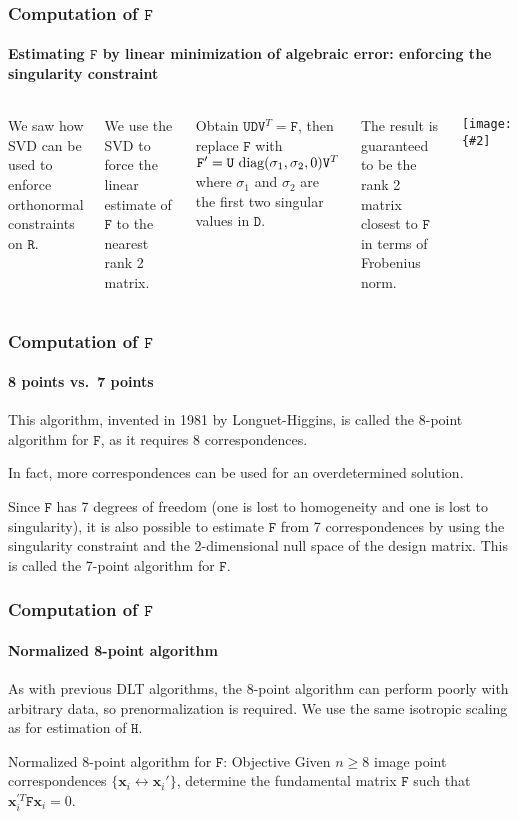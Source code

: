 \documentclass[aspectratio=169]{beamer}
\renewcommand{\vec}[1]{\boldsymbol{#1}}
\newcommand{\mat}[1]{\mathtt{#1}}
\newcommand{\myfig}[3]{\centerline{\texttt{[image: \{\#2]}}}
    \centerline{\scriptsize #3}}
\begin{document}
\begin{frame}
\frametitle{Computation of $\mat{F}$}
\framesubtitle{Estimating $\mat{F}$ by linear minimization of
  algebraic error: enforcing the singularity constraint}

\begin{columns}
\column{2.5in} We saw how SVD can be used to enforce orthonormal
constraints on $\mat{R}$.

\medskip

We use the SVD to force the linear estimate of $\mat{F}$ to the
\alert{nearest rank 2 matrix}.

\medskip

Obtain $\mat{U}\mat{D}\mat{V}^T=\mat{F}$, then
replace $\mat{F}$ with $\mat{F}'=\mat{U}\text{\
diag}(\sigma_1,\sigma_2,0)\mat{V}^T$ where $\sigma_1$ and $\sigma_2$
are the first two singular values in $\mat{D}$.

\medskip

The result is guaranteed to be the rank 2 matrix
closest to $\mat{F}$ in terms of Frobenius norm.

\column{2in}
\myfig{1.9in}{HZ-fig10-1b}{Hartley and Zisserman (2004), Fig.\ 11.1(b)}

\end{columns}

\end{frame}

\begin{frame}
\frametitle{Computation of $\mat{F}$}
\framesubtitle{8 points vs.\ 7 points}

This algorithm, invented in 1981 by Longuet-Higgins, is called the
\alert{8-point algorithm} for $\mat{F}$, as it requires 8
correspondences.

\medskip

In fact, more correspondences can be used for an overdetermined
solution.

\medskip

Since $\mat{F}$ has 7 degrees of freedom (one is lost to homogeneity
and one is lost to singularity), it is also possible to estimate
$\mat{F}$ from 7 correspondences by using the singularity constraint
and the 2-dimensional null space of the design matrix.  This is called
the \alert{7-point algorithm} for $\mat{F}$.

\end{frame}

\begin{frame}
\frametitle{Computation of $\mat{F}$}
\framesubtitle{Normalized 8-point algorithm}

As with previous DLT algorithms, the 8-point algorithm can perform
poorly with arbitrary data, so prenormalization is required.  We use
the same isotropic scaling as for estimation of $\mat{H}$.

\medskip

\begin{block}{Normalized 8-point algorithm for $\mat{F}$: Objective}
Given $n \ge 8$ image point correspondences $\{\vec{x}_i
\leftrightarrow \vec{x}_i'\}$, determine the fundamental matrix
$\mat{F}$ such that $\vec{x}_i^{\prime T}\mat{F}\vec{x}_i = 0$.
\end{block}

\end{frame}
\end{document}
